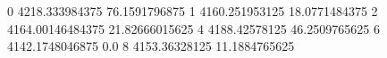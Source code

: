 0 4218.333984375 76.1591796875
1 4160.251953125 18.0771484375
2 4164.00146484375 21.82666015625
4 4188.42578125 46.2509765625
6 4142.1748046875 0.0
8 4153.36328125 11.1884765625
